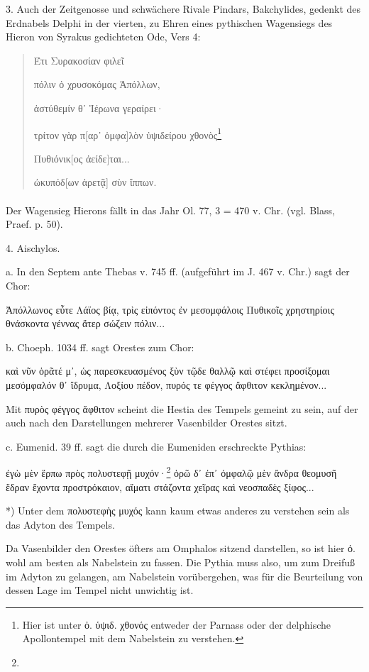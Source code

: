 \documentclass[a4paper, 11pt, oneside]{article}
\begin{document}
3. Auch der Zeitgenosse und schwächere Rivale Pindars, Bakchylides, gedenkt des Erdnabels Delphi in der vierten, zu Ehren eines pythischen Wagensiegs des Hieron von Syrakus gedichteten Ode, Vers 4:
\begin{quotation}
Έτι Συρακοσίαν φιλεῖ

πόλιν ὁ χρυσοκόμας Ἀπόλλων,

ἀστύθεμίν θ᾽ Ἱέρωνα γεραίρει·

τρίτον γὰρ π[αρ᾽ ὀμφα]λὸν ὑψιδείρου χθονὸς\footnote{Hier ist unter ὀ. ὑψιδ. χθονός entweder der Parnass oder der delphische Apollontempel mit dem Nabelstein zu verstehen.}

Πυθιόνικ[ος ἀείδε]ται...

ὠκυπόδ[ων ἀρετᾷ] σὺν ἵππων.
\end{quotation}
\paragraph{}
Der Wagensieg Hierons fällt in das Jahr Ol. 77, 3 = 470 v. Chr. (vgl. Blass, Praef. p. 50).

4. Aischylos.

a. In den Septem ante Thebas v. 745 ff. (aufgeführt im J. 467 v. Chr.) sagt der Chor:

Ἀπόλλωνος εὖτε Λάϊος  
βίᾳ, τρὶς εἰπόντος ἐν  
μεσομφάλοις Πυθικοῖς  
χρηστηρίοις θνάσκοντα γέννας ἄτερ σώζειν πόλιν...

b. Choeph. 1034 ff. sagt Orestes zum Chor:

καὶ νῦν ὁρᾶτέ μ᾽, ὡς παρεσκευασμένος  
ξὺν τῷδε θαλλῷ καὶ στέφει προσίξομαι  
μεσόμφαλόν θ᾽ ἴδρυμα, Λοξίου πέδον,  
πυρός τε φέγγος ἄφθιτον κεκλημένον...

Mit πυρὸς φέγγος ἄφθιτον scheint die Hestia des Tempels gemeint zu sein, auf der auch nach den Darstellungen mehrerer Vasenbilder Orestes sitzt.

c. Eumenid. 39 ff. sagt die durch die Eumeniden erschreckte Pythias:

ἐγὼ μὲν ἕρπω πρὸς πολυστεφῇ μυχόν·\footnote{}  
ὁρῶ δ᾽ ἐπ᾽ ὀμφαλῷ μὲν ἄνδρα θεομυσῆ  
ἕδραν ἔχοντα προστρόκαιον, αἵματι  
στάζοντα χεῖρας καὶ νεοσπαδὲς ξίφος...

*) Unter dem πολυστεφὴς μυχός kann kaum etwas anderes zu verstehen sein als das Adyton des Tempels.

Da Vasenbilder den Orestes öfters am Omphalos sitzend darstellen, so ist hier ὀ. wohl am besten als Nabelstein zu fassen. Die Pythia muss also, um zum Dreifuß im Adyton zu gelangen, am Nabelstein vorübergehen, was für die Beurteilung von dessen Lage im Tempel nicht unwichtig ist.
\end{document}
